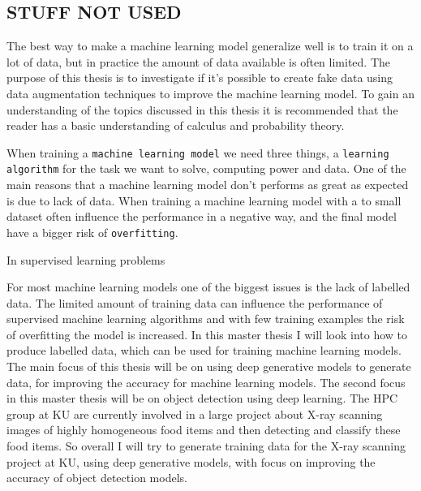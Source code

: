 





\subsection{STUFF NOT USED}
The best way to make a machine learning model generalize well is to train it on a lot of data, but in practice the amount of data available is often limited. The purpose of this thesis is to investigate if it's possible to create fake data using data augmentation techniques to improve the machine learning model. To gain an understanding of the topics discussed in this thesis it is recommended that the reader has a basic understanding of calculus and probability theory. 

When training a \texttt{machine learning model} we need three things, a \texttt{learning algorithm} for the task we want to solve, computing power and data. One of the main reasons that a machine learning model don't performs as great as expected is due to lack of data. When training a machine learning model with a to small dataset often influence the performance in a negative way, and the final model have a bigger risk of \texttt{overfitting}. 
 
In supervised learning problems 




For most machine learning models one of the biggest issues is the lack of labelled data. The
limited amount of training data can influence the performance of supervised machine
learning algorithms and with few training examples the risk of overfitting the model is
increased.
In this master thesis I will look into how to produce labelled data, which can be used for
training machine learning models.
The main focus of this thesis will be on using deep generative models to generate data, for
improving the accuracy for machine learning models.
The second focus in this master thesis will be on object detection using deep learning. The
HPC group at KU are currently involved in a large project about X-ray scanning images of
highly homogeneous food items and then detecting and classify these food items. So overall
I will try to generate training data for the X-ray scanning project at KU, using deep generative
models, with focus on improving the accuracy of object detection models.

